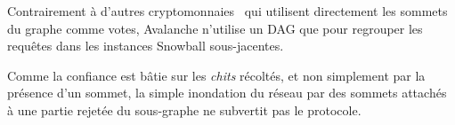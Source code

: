 \documentclass[letterpaper,twocolumn,10pt]{article}
\theoremstyle{definition}
\begin{document}
Contrairement à d'autres cryptomonnaies~\cite{IOTA} qui utilisent directement les sommets du graphe comme votes, Avalanche n'utilise un DAG que pour regrouper les requêtes dans les instances Snowball sous-jacentes.

Comme la confiance est bâtie sur les \emph{chits} récoltés, et non simplement par la présence d'un sommet, la simple inondation du réseau par des sommets attachés à une partie rejetée du sous-graphe ne subvertit pas le protocole.

\end{document}
